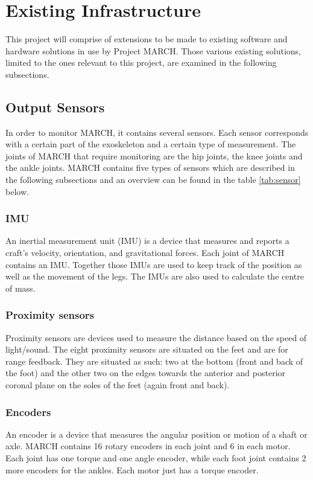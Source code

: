 \section{Existing Infrastructure}\label{sec:infra}
This project will comprise of extensions to be made to existing software and hardware solutions in use by Project MARCH. Those various existing solutions, limited to the ones relevant to this project, are examined in the following subsections.
\subsection{Output Sensors}
In order to monitor MARCH, it contains several sensors. Each sensor corresponds with a certain part of the exoskeleton and a certain type of measurement. The joints of MARCH that require monitoring are the hip joints, the knee joints and the ankle joints. MARCH contains five types of sensors which are described in the following subsections and an overview can be found in the table \ref{tab:sensor} below.
\subsubsection{IMU}
An inertial measurement unit (IMU) is a device that measures and reports a craft's velocity, orientation, and gravitational forces. Each joint of MARCH contains an IMU. Together those IMUs are used to keep track of the position as well as the movement of the legs. The IMUs are also used to calculate the centre of mass. 
\subsubsection{Proximity sensors}
Proximity sensors are devices used to measure the distance based on the speed of light/sound. The eight proximity sensors are situated on the feet and are for range feedback. They are situated as such: two at the bottom (front and back of the foot) and the other two on the edges towards the anterior and posterior coronal plane on the soles of the feet (again front and back). 
\subsubsection{Encoders}
An encoder is a device that measures the angular position or motion of a shaft or axle. MARCH contains 16 rotary encoders in each joint and 6 in each motor. Each joint has one torque and one angle encoder, while each foot joint contains 2 more encoders for the ankles. Each motor just has a torque encoder.
